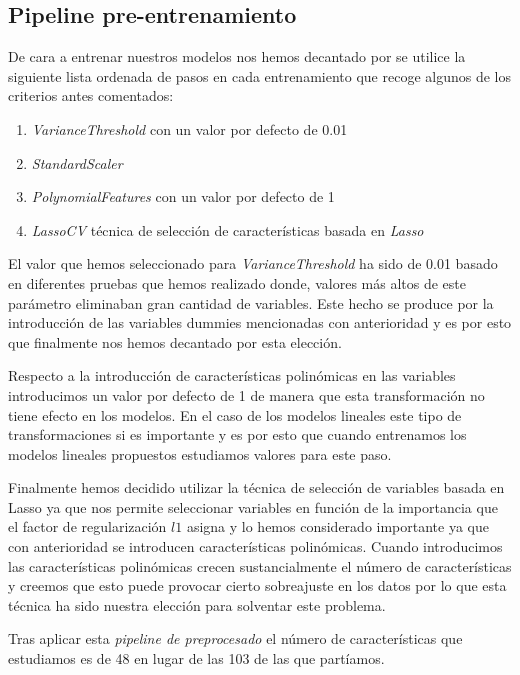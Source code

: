 \documentclass[11pt]{article}
\begin{document}
\subsection{Pipeline pre-entrenamiento}

De cara a entrenar nuestros modelos nos hemos decantado por se utilice la
siguiente lista ordenada de pasos en cada entrenamiento que recoge algunos de
los criterios antes comentados:

\begin{enumerate}
    \item \textit{VarianceThreshold} con un valor por defecto de 0.01
    \item \textit{StandardScaler}
    \item \textit{PolynomialFeatures} con un valor por defecto de 1
    \item \textit{LassoCV} técnica de selección de características basada en \textit{Lasso}
\end{enumerate}

El valor que hemos seleccionado para \textit{VarianceThreshold} ha sido de 0.01
basado en diferentes pruebas que hemos realizado donde, valores más altos de
este parámetro eliminaban gran cantidad de variables. Este hecho se produce por 
la introducción de las variables dummies mencionadas con anterioridad y es por esto
que finalmente nos hemos decantado por esta elección.

Respecto a la introducción de características polinómicas en las variables
introducimos un valor por defecto de 1 de manera que esta transformación no
tiene efecto en los modelos. En el caso de los modelos lineales este tipo de
transformaciones si es importante y es por esto que cuando entrenamos los modelos 
lineales propuestos estudiamos valores para este paso. 

Finalmente hemos decidido utilizar la técnica de selección de variables basada
en Lasso ya que nos permite seleccionar variables en función de la importancia
que el factor de regularización $l1$ asigna y lo hemos considerado importante ya
que con anterioridad se introducen características polinómicas. Cuando
introducimos las características polinómicas crecen sustancialmente  el número
de características y creemos que esto puede provocar cierto sobreajuste en los
datos por lo que esta técnica ha sido nuestra elección para solventar este
problema.

Tras aplicar esta \textit{pipeline de preprocesado} el número de características
que estudiamos es de 48 en lugar de las 103 de las que partíamos. 
\end{document}

